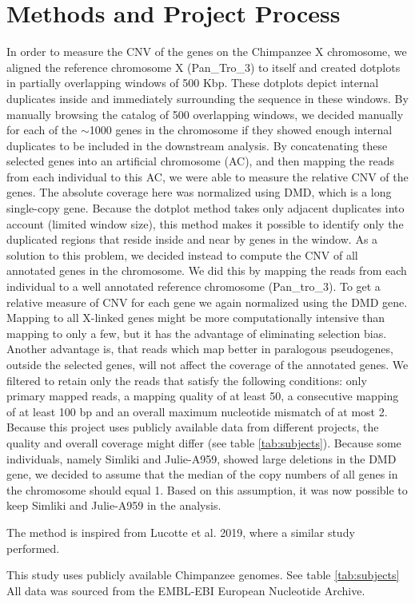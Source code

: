 \section*{Methods and Project Process}
In order to measure the CNV of the genes on the Chimpanzee X chromosome, we aligned the reference chromosome X (Pan\_Tro\_3) to itself and created dotplots in partially overlapping windows of 500 Kbp. These dotplots depict internal duplicates inside and immediately surrounding the sequence in these windows. By manually browsing the catalog of 500 overlapping windows, we decided manually for each of the $\sim$1000 genes in the chromosome if they showed enough internal duplicates to be included in the downstream analysis. By concatenating these selected genes into an artificial chromosome (AC), and then mapping the reads from each individual to this AC, we were able to measure the relative CNV of the genes. The absolute coverage here was normalized using DMD, which is a long single-copy gene. Because the dotplot method takes only adjacent duplicates into account (limited window size), this method makes it possible to identify only the duplicated regions that reside inside and near by genes in the window. As a solution to this problem, we decided instead to  compute the CNV of all annotated genes in the chromosome. We did this by mapping the reads from each individual to a well annotated reference chromosome (Pan\_tro\_3). To get a relative measure of CNV for each gene we again normalized using the DMD gene. Mapping to all X-linked genes might be more computationally intensive than mapping to only a few, but it has the advantage of eliminating selection bias. Another advantage is, that reads which map better in paralogous pseudogenes, outside the selected genes, will not affect the coverage of the annotated genes. We filtered to retain only the reads that satisfy the following conditions: only primary mapped reads, a mapping quality of at least 50, a consecutive mapping of at least 100 bp and an overall maximum nucleotide mismatch of at most 2. Because this project uses publicly available data from different projects, the quality and overall coverage might differ (see table \ref{tab:subjects}). Because some individuals, namely Simliki and Julie-A959, showed large deletions in the DMD gene, we decided to assume that the median of the copy numbers of all genes in the chromosome should equal 1. Based on this assumption, it was now possible to keep Simliki and Julie-A959 in the analysis.

The method is inspired from Lucotte et al. 2019\cite{Lucotte907}, where a similar study performed.

This study uses publicly available Chimpanzee genomes. See table \ref{tab:subjects} All data was sourced from the EMBL-EBI European Nucleotide Archive.